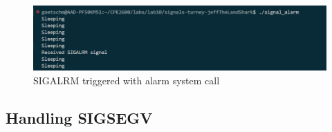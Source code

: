 \documentclass{assignment}
\begin{document}
\begin{figure}
    \centering
    \includegraphics[width=1\linewidth]{images/SIGALRM.png}
    \caption{SIGALRM triggered with alarm system call}
\end{figure}

\subsection{Handling SIGSEGV}



\end{document}
